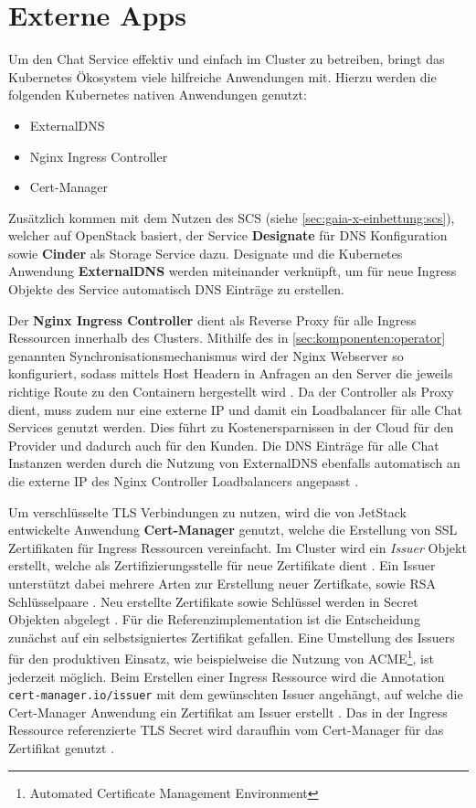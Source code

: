 \section{Externe Apps}
\label{sec:komponenten:externe-apps}

Um den Chat Service effektiv und einfach im Cluster zu betreiben, bringt das Kubernetes Ökosystem viele hilfreiche Anwendungen mit.
Hierzu werden die folgenden Kubernetes nativen Anwendungen genutzt:
\begin{itemize}
  \item ExternalDNS
  \item Nginx Ingress Controller
  \item Cert-Manager
\end{itemize}

Zusätzlich kommen mit dem Nutzen des \acf{SCS} (siehe \ref{sec:gaia-x-einbettung:scs}),
welcher auf OpenStack basiert, der Service \textbf{Designate}
für DNS Konfiguration sowie \textbf{Cinder} als Storage Service dazu. 
Designate und die Kubernetes Anwendung \textbf{ExternalDNS} werden miteinander
verknüpft, um für neue Ingress Objekte des Service automatisch DNS Einträge zu erstellen. 

Der \textbf{Nginx Ingress Controller} dient als Reverse Proxy für alle Ingress Ressourcen innerhalb des Clusters.
Mithilfe des in \ref{sec:komponenten:operator} genannten Synchronisationsmechanismus wird der Nginx Webserver so 
konfiguriert, sodass mittels Host Headern in Anfragen an den Server die jeweils richtige Route zu den Containern hergestellt wird \cite{nginxIngressController}. 
Da der Controller als Proxy dient, muss zudem nur eine externe IP und damit ein Loadbalancer für alle Chat Services genutzt werden.
Dies führt zu Kostenersparnissen in der Cloud für den Provider und dadurch auch für den Kunden.
Die DNS Einträge für alle Chat Instanzen werden durch die Nutzung 
von ExternalDNS ebenfalls automatisch an die externe IP des Nginx Controller Loadbalancers angepasst \cite{externalDNS}.

Um verschlüsselte TLS Verbindungen zu nutzen, wird die von JetStack entwickelte Anwendung \textbf{Cert-Manager} genutzt,
welche die Erstellung von SSL Zertifikaten für Ingress Ressourcen vereinfacht. Im Cluster wird ein \emph{Issuer} Objekt
erstellt, welche als Zertifizierungsstelle für neue Zertifikate dient \cite{CertManager2021}. 
Ein Issuer unterstützt dabei mehrere Arten zur Erstellung neuer Zertifkate, sowie RSA Schlüsselpaare \cite{CertManager2021}.
Neu erstellte Zertifikate sowie Schlüssel werden in Secret Objekten abgelegt \cite{CertManager2021}.
Für die Referenzimplementation ist die Entscheidung zunächst auf ein selbstsigniertes Zertifikat gefallen.
Eine Umstellung des Issuers für den produktiven Einsatz, 
wie beispielweise die Nutzung von ACME\footnote{Automated Certificate Management Environment},
ist jederzeit möglich. 
Beim Erstellen einer Ingress Ressource wird die Annotation \texttt{cert-manager.io/issuer} mit dem gewünschten Issuer angehängt,
auf welche die Cert-Manager Anwendung ein Zertifikat am Issuer erstellt \cite{CertManager2021}. 
Das in der Ingress Ressource referenzierte TLS Secret wird daraufhin vom Cert-Manager für das Zertifikat genutzt \cite{CertManager2021}.

